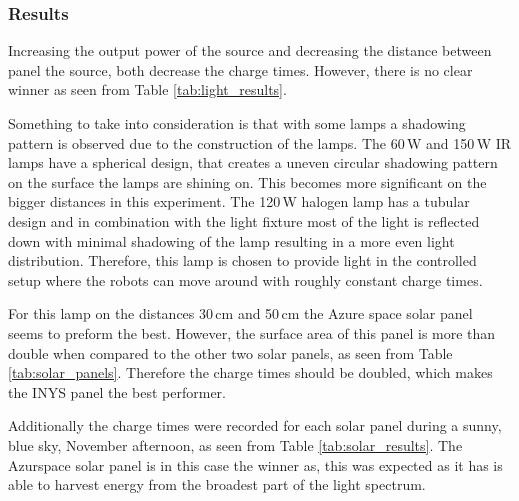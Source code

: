 \subsubsection{Results}

Increasing the output power of the source and decreasing the distance between panel the source, both decrease the charge times.
However, there is no clear winner as seen from Table \ref{tab:light_results}.

Something to take into consideration is that with some lamps a shadowing pattern is observed due to the construction of the lamps.
The 60\,W and 150\,W IR lamps have a spherical design, that creates a uneven circular shadowing pattern on the surface the lamps are shining on. 
This becomes more significant on the bigger distances in this experiment.
The 120\,W halogen lamp has a tubular design and in combination with the light fixture most of the light is reflected down with minimal shadowing of the lamp resulting in a more even light distribution.
Therefore, this lamp is chosen to provide light in the controlled setup where the robots can move around with roughly constant charge times.

For this lamp on the distances 30\,cm and 50\,cm the Azure space solar panel seems to preform the best.
However, the surface area of this panel is more than double when compared to the other two solar panels, as seen from Table \ref{tab:solar_panels}.
Therefore the charge times should be doubled, which makes the INYS panel the best performer.

Additionally the charge times were recorded for each solar panel during a sunny, blue sky, November afternoon, as seen from Table \ref{tab:solar_results}.
The Azurspace solar panel is in this case the winner as, this was expected as it has is able to harvest energy from the broadest part of the light spectrum.


